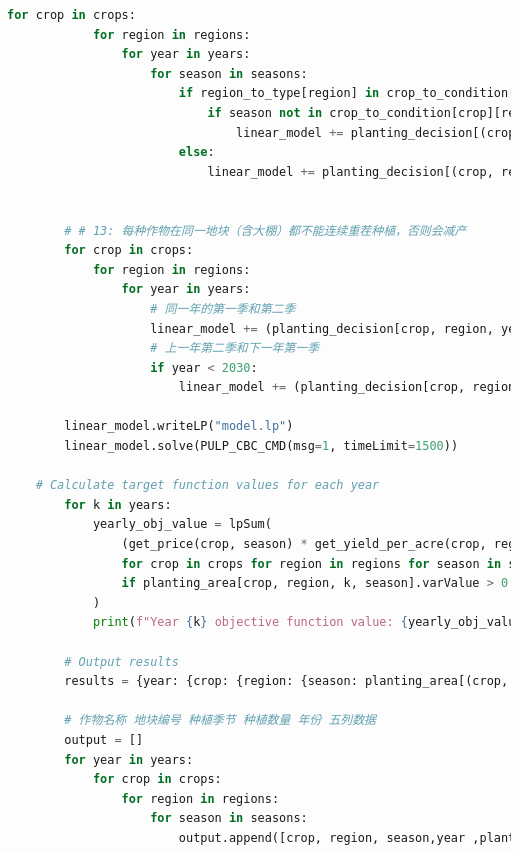 \documentclass[withoutpreface]{cumcmthesis}
\begin{document}
\begin{appendices}
\begin{lstlisting}[language=python]
        for crop in crops:
            for region in regions:
                for year in years:
                    for season in seasons:
                        if region_to_type[region] in crop_to_condition[crop]:
                            if season not in crop_to_condition[crop][region_to_type[region]]:
                                linear_model += planting_decision[(crop, region, year, season)] == 0
                        else:
                            linear_model += planting_decision[(crop, region, year, season)] == 0
                            
        
        # # 13: 每种作物在同一地块（含大棚）都不能连续重茬种植，否则会减产
        for crop in crops:
            for region in regions:
                for year in years:
                    # 同一年的第一季和第二季
                    linear_model += (planting_decision[crop, region, year, '第一季'] + planting_decision[crop, region, year, '第二季'] <= 1)
                    # 上一年第二季和下一年第一季
                    if year < 2030:
                        linear_model += (planting_decision[crop, region, year, '第二季'] + planting_decision[crop, region, year+1, '第一季'] <= 1)
    
        linear_model.writeLP("model.lp")
        linear_model.solve(PULP_CBC_CMD(msg=1, timeLimit=1500))
    
    # Calculate target function values for each year
        for k in years:
            yearly_obj_value = lpSum(
                (get_price(crop, season) * get_yield_per_acre(crop, region) - get_cost(crop, region)) * planting_area[crop, region, k, season].varValue
                for crop in crops for region in regions for season in seasons
                if planting_area[crop, region, k, season].varValue > 0  # Only consider variables with planting area greater than 0
            )
            print(f"Year {k} objective function value: {yearly_obj_value}")
    
        # Output results
        results = {year: {crop: {region: {season: planting_area[(crop, region, year, season)].varValue for season in seasons} for region in regions} for crop in crops} for year in years}
    
        # 作物名称 地块编号 种植季节 种植数量 年份 五列数据
        output = []
        for year in years:
            for crop in crops:
                for region in regions:
                    for season in seasons:
                        output.append([crop, region, season,year ,planting_area[(crop, region, year, season)].varValue])
    

\end{lstlisting}
\end{appendices}
\end{document}
